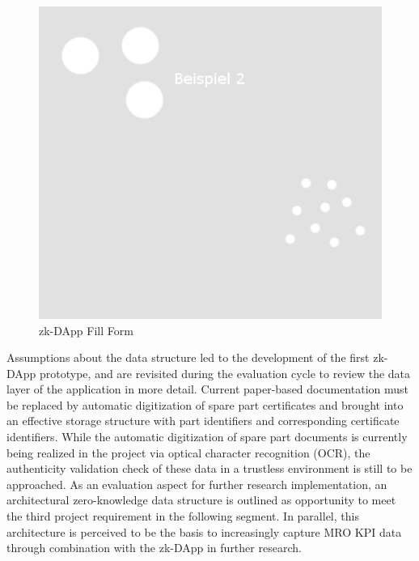 \begin{figure}[hbt]
	\centering
		\includegraphics[width=1.0\textwidth]{Pictures/bsp2.png}
	\caption{zk-DApp Fill Form}
	\label{fig:form1}
\end{figure}

Assumptions about the data structure led to the development of the first zk-DApp prototype, and are revisited during the evaluation cycle to review the data layer of the application in more detail. Current paper-based documentation must be replaced by automatic digitization of spare part certificates and brought into an effective storage structure with part identifiers and corresponding certificate identifiers. While the automatic digitization of spare part documents is currently being realized in the project via optical character recognition (OCR), the authenticity validation check of these data in a trustless environment is still to be approached. As an evaluation aspect for further research implementation, an architectural  zero-knowledge data structure is outlined as opportunity to meet the third project requirement in the following segment. In parallel, this architecture is perceived to be the basis to increasingly capture MRO KPI data through combination with the zk-DApp in further research. 

